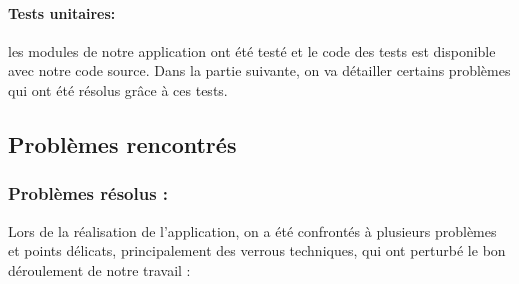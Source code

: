 		\paragraph{Tests unitaires:} les modules de notre application ont été testé et le code des tests est disponible avec notre code source. Dans la partie suivante, on va détailler certains problèmes qui ont été résolus grâce à ces tests.
		
		\subsection{Problèmes rencontrés}
			\subsubsection*{Problèmes résolus :} 
			Lors de la réalisation de l'application, on a été confrontés à plusieurs problèmes et points délicats, principalement des verrous techniques, qui ont perturbé le bon déroulement de notre travail :
